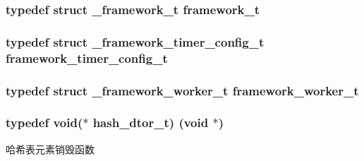 \subsubsection[{framework\+\_\+t}]{\setlength{\rightskip}{0pt plus 5cm}typedef struct {\bf \+\_\+framework\+\_\+t} {\bf framework\+\_\+t}}\label{a00051_a6149d769f6f07ed14a40a271c95d8463_a6149d769f6f07ed14a40a271c95d8463}
\hypertarget{a00051_a5897519e55beac27c0c789a37e3e0daf_a5897519e55beac27c0c789a37e3e0daf}{}
\subsubsection[{framework\+\_\+timer\+\_\+config\+\_\+t}]{\setlength{\rightskip}{0pt plus 5cm}typedef struct \+\_\+framework\+\_\+timer\+\_\+config\+\_\+t {\bf framework\+\_\+timer\+\_\+config\+\_\+t}}\label{a00051_a5897519e55beac27c0c789a37e3e0daf_a5897519e55beac27c0c789a37e3e0daf}
\hypertarget{a00051_aeb7a44e6b579659a8aae81f3ab819af3_aeb7a44e6b579659a8aae81f3ab819af3}{}
\subsubsection[{framework\+\_\+worker\+\_\+t}]{\setlength{\rightskip}{0pt plus 5cm}typedef struct {\bf \+\_\+framework\+\_\+worker\+\_\+t} {\bf framework\+\_\+worker\+\_\+t}}\label{a00051_aeb7a44e6b579659a8aae81f3ab819af3_aeb7a44e6b579659a8aae81f3ab819af3}
\hypertarget{a00051_a5dcd1ed9242185e4448352748e58573d_a5dcd1ed9242185e4448352748e58573d}{}
\subsubsection[{hash\+\_\+dtor\+\_\+t}]{\setlength{\rightskip}{0pt plus 5cm}typedef void($\ast$ hash\+\_\+dtor\+\_\+t) (void $\ast$)}\label{a00051_a5dcd1ed9242185e4448352748e58573d_a5dcd1ed9242185e4448352748e58573d}
哈希表元素销毁函数 \hypertarget{a00051_a188677c3015513590ab998e96b999966_a188677c3015513590ab998e96b999966}{}
